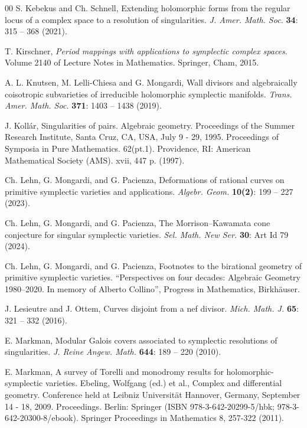 \documentclass[12pt,reqno]{amsart}
\theoremstyle{plain}
\theoremstyle{definition}
\begin{document}
\begin{thebibliography}{00}
S. Kebekus and Ch. Schnell, Extending holomorphic forms from the regular locus of a complex space to a resolution of singularities. \textit{J. Amer. Math. Soc.} \textbf{34}: 315 -- 368 (2021).

 
T. Kirschner, \textit{Period mappings with applications to symplectic complex spaces}. Volume
2140 of Lecture Notes in Mathematics. Springer, Cham, 2015.

A.\! L. Knutsen, M. Lelli-Chiesa and G. Mongardi,
Wall divisors and algebraically coisotropic subvarieties of irreducible holomorphic symplectic manifolds. \textit{Trans. Amer. Math. Soc.} \textbf{371}: 1403 -- 1438 (2019).

J. Koll\'ar, Singularities of pairs. Algebraic geometry. Proceedings of the Summer Research Institute, Santa Cruz, CA, USA, July 9 - 29, 1995. Proceedings of Symposia in Pure Mathematics. 62(pt.1). Providence, RI: American Mathematical Society (AMS). xvii, 447 p. (1997).

Ch. Lehn, G. Mongardi, and G. Pacienza,  Deformations of rational curves on primitive symplectic varieties and applications. \textit{Algebr. Geom.} \textbf{10(2)}: 199 -- 227 (2023).

Ch. Lehn, G. Mongardi, and G. Pacienza, 
The Morrison--Kawamata cone conjecture for singular symplectic varieties. \textit{Sel. Math. New Ser.} \textbf{30}: Art Id 79 (2024).

Ch. Lehn, G. Mongardi, and G. Pacienza, Footnotes to the birational geometry of primitive symplectic varieties. ``Perspectives on four decades: Algebraic Geometry 1980--2020. In memory of Alberto Collino'', Progress in Mathematics, Birkh\"auser.

J. Lesieutre and J. Ottem, Curves disjoint from a nef divisor. \textit{Mich. Math. J.} \textbf{65}: 321 -- 332 (2016).

E. Markman, Modular Galois covers associated to symplectic resolutions of singularities. \textit{J. Reine Angew. Math.} \textbf{644}: 189 -- 220 (2010).

E. Markman, A survey of Torelli and monodromy results for holomorphic-symplectic varieties. Ebeling, Wolfgang (ed.) et al., Complex and differential geometry. Conference held at Leibniz Universit\"at Hannover, Germany, September 14 - 18, 2009. Proceedings. Berlin: Springer (ISBN 978-3-642-20299-5/hbk; 978-3-642-20300-8/ebook). Springer Proceedings in Mathematics 8, 257-322 (2011).



\end{thebibliography}
\end{document}
